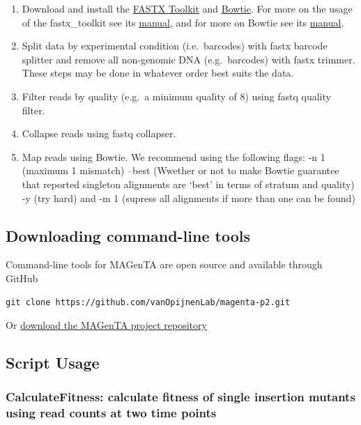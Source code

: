 \documentclass[11pt,]{article}
\providecommand{\tightlist}{%
  \setlength{\itemsep}{0pt}\setlength{\parskip}{0pt}}
\begin{document}
\begin{enumerate}
\def\labelenumi{\arabic{enumi}.}
\tightlist
\item
  Download and install the
  \href{http://hannonlab.cshl.edu/fastx_toolkit/}{FASTX Toolkit} and
  \href{http://bowtie-bio.sourceforge.net/index.shtml}{Bowtie}. For more
  on the usage of the fastx\_toolkit see its
  \href{http://hannonlab.cshl.edu/fastx_toolkit/commandline.html}{manual},
  and for more on Bowtie see its
  \href{http://bowtie-bio.sourceforge.net/manual.shtml}{manual}.
\item
  Split data by experimental condition (i.e.~barcodes) with fastx
  barcode splitter and remove all non-genomic DNA (e.g.~barcodes) with
  fastx trimmer. These steps may be done in whatever order best suits
  the data.
\item
  Filter reads by quality (e.g.~a minimum quality of 8) using fastq
  quality filter.
\item
  Collapse reads using fastq collapser.
\item
  Map reads using Bowtie. We recommend using the following flags: -n 1
  (maximum 1 mismatch) --best (Wwether or not to make Bowtie guarantee
  that reported singleton alignments are `best' in terms of stratum and
  quality) -y (try hard) and -m 1 (supress all alignments if more than
  one can be found)
\end{enumerate}

\subsection{Downloading command-line
tools}\label{downloading-command-line-tools}

Command-line tools for MAGenTA are open source and available through
GitHub

\begin{verbatim}
git clone https://github.com/vanOpijnenLab/magenta-p2.git
\end{verbatim}

Or \href{https://github.com/vanOpijnenLab/magenta-p2}{download the
MAGenTA project repository}

\subsection{Script Usage}\label{script-usage}

\subsubsection{CalculateFitness: calculate fitness of single insertion
mutants using read counts at two time
points}\label{calculatefitness-calculate-fitness-of-single-insertion-mutants-using-read-counts-at-two-time-points}
\end{document}

